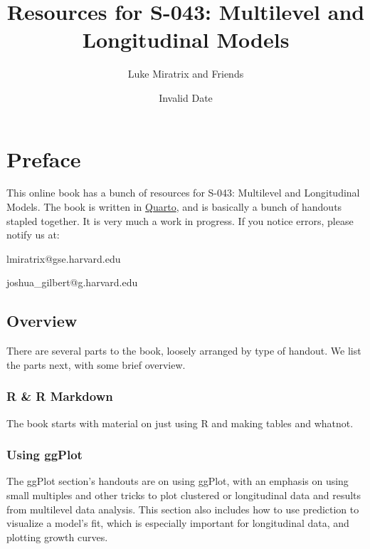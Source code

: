 \documentclass[
  letterpaper,
  DIV=11,
  numbers=noendperiod]{scrreprt}
\title{Resources for S-043: Multilevel and Longitudinal Models}
\author{Luke Miratrix and Friends}
\date{Invalid Date}
\renewcommand*\contentsname{Table of contents}
\newcommand\contentsname{Table of contents}
\begin{document}
\maketitle
\renewcommand*\contentsname{Table of contents}
{
\hypersetup{linkcolor=}
\setcounter{tocdepth}{2}
\tableofcontents
}

\hypertarget{preface}{%
\chapter*{Preface}\label{preface}}


This online book has a bunch of resources for S-043: Multilevel and
Longitudinal Models. The book is written in
\href{https://quarto.org/}{Quarto}, and is basically a bunch of handouts
stapled together. It is very much a work in progress. If you notice
errors, please notify us at:

lmiratrix@gse.harvard.edu

joshua\_gilbert@g.harvard.edu

\hypertarget{overview}{%
\section*{Overview}\label{overview}}


There are several parts to the book, loosely arranged by type of
handout. We list the parts next, with some brief overview.

\hypertarget{r-r-markdown}{%
\subsection*{R \& R Markdown}\label{r-r-markdown}}

The book starts with material on just using R and making tables and
whatnot.

\hypertarget{using-ggplot}{%
\subsection*{Using ggPlot}\label{using-ggplot}}

The ggPlot section's handouts are on using ggPlot, with an emphasis on
using small multiples and other tricks to plot clustered or longitudinal
data and results from multilevel data analysis. This section also
includes how to use prediction to visualize a model's fit, which is
especially important for longitudinal data, and plotting growth curves.
\end{document}
